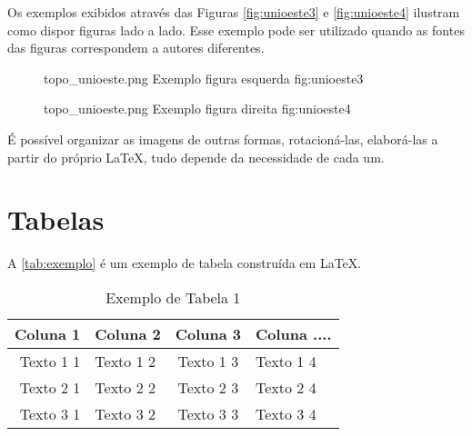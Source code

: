 Os exemplos exibidos através das Figuras \ref{fig:unioeste3} e \ref{fig:unioeste4} ilustram como dispor figuras lado a lado. Esse exemplo pode ser utilizado quando as fontes das figuras correspondem a autores diferentes.

\begin{figure}[h!]
    \begin{minipage}[b]{0.50\linewidth}
        {topo_unioeste.png}                 %
        {Exemplo figura esquerda}           %
        {fig:unioeste3}                     %
    \end{minipage} \hfill
    \begin{minipage}[b]{0.48\linewidth}    
        {topo_unioeste.png}                 %
        {Exemplo figura direita}           %
        {fig:unioeste4}                     %
    \end{minipage}
\end{figure}

É possível organizar as imagens de outras formas, rotacioná-las, elaborá-las a partir do próprio \LaTeX, tudo depende da necessidade de cada um.


\section{Tabelas}

A \autoref{tab:exemplo} é um exemplo de tabela construída em \LaTeX.

\begin{table}[htb]
\ABNTEXfontereduzida
\centering

\caption[Exemplo de tabela 1]{Exemplo de Tabela 1}
\label{tab:exemplo}

\begin{tabular}{r|p{6.0cm}|c|p{3.40cm}}
   \textbf{Coluna 1} & \textbf{Coluna 2}  & \textbf{Coluna 3}  & \textbf{Coluna ....}  \\  \hline \hline
    Texto 1 1 & Texto 1 2 & Texto 1 3 & Texto 1 4  \\     \hline
    Texto 2 1 & Texto 2 2 & Texto 2 3 & Texto 2 4 \\     \hline
    Texto 3 1 & Texto 3 2 & Texto 3 3  & Texto 3 4   \\   
\end{tabular}
\end{table}

